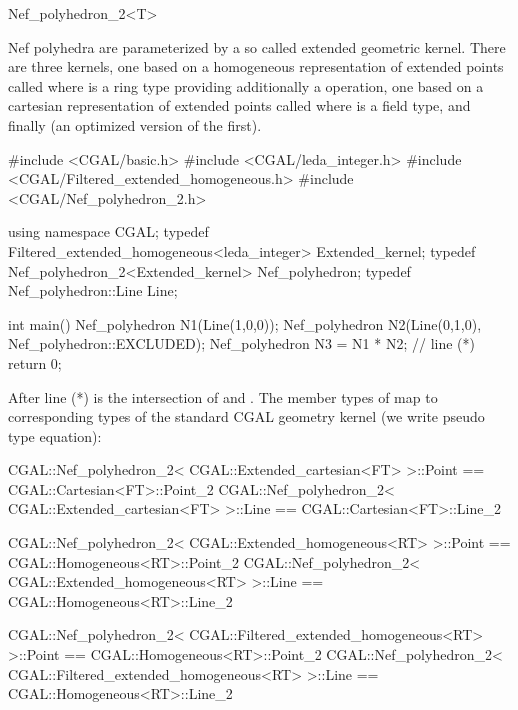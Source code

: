 \begin{ccRefClass}{Nef_polyhedron_2<T>}
\ccExample

Nef polyhedra are parameterized by a so called extended geometric
kernel. There are three kernels, one based on a homogeneous
representation of extended points called
 where  is a ring type providing
additionally a  operation, one based on a cartesian
representation of extended points called 
where  is a field type, and finally
 (an optimized version of the
first).
\begin{ccExampleCode}
#include <CGAL/basic.h>
#include <CGAL/leda_integer.h>
#include <CGAL/Filtered_extended_homogeneous.h>
#include <CGAL/Nef_polyhedron_2.h>

using namespace CGAL;
typedef  Filtered_extended_homogeneous<leda_integer> Extended_kernel;
typedef  Nef_polyhedron_2<Extended_kernel>  Nef_polyhedron;
typedef  Nef_polyhedron::Line               Line;

int main()
{
  Nef_polyhedron N1(Line(1,0,0));
  Nef_polyhedron N2(Line(0,1,0), Nef_polyhedron::EXCLUDED);
  Nef_polyhedron N3 = N1 * N2; // line (*)
  return 0;
}
\end{ccExampleCode}
After line (*)  is the intersection of  and . 
The member types of 
map to corresponding types of the standard CGAL geometry kernel
(we write pseudo type equation):
\begin{ccExampleCode}
CGAL::Nef_polyhedron_2< CGAL::Extended_cartesian<FT> >::Point
  == CGAL::Cartesian<FT>::Point_2
CGAL::Nef_polyhedron_2< CGAL::Extended_cartesian<FT> >::Line
  == CGAL::Cartesian<FT>::Line_2

CGAL::Nef_polyhedron_2< CGAL::Extended_homogeneous<RT> >::Point
   == CGAL::Homogeneous<RT>::Point_2
CGAL::Nef_polyhedron_2< CGAL::Extended_homogeneous<RT> >::Line
   == CGAL::Homogeneous<RT>::Line_2

CGAL::Nef_polyhedron_2< CGAL::Filtered_extended_homogeneous<RT> >::Point
   == CGAL::Homogeneous<RT>::Point_2
CGAL::Nef_polyhedron_2< CGAL::Filtered_extended_homogeneous<RT> >::Line
   == CGAL::Homogeneous<RT>::Line_2
\end{ccExampleCode}

\end{ccRefClass}


